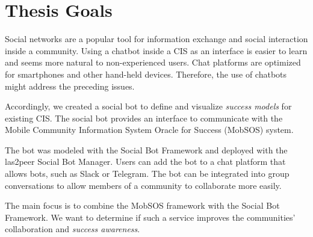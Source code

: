 \section{Thesis Goals}

Social networks are a popular tool for information exchange and social interaction inside a community.
Using a chatbot inside a CIS as an interface is easier to learn and seems more natural to non-experienced users.
Chat platforms are optimized for smartphones and other hand-held devices. Therefore, the use of chatbots might address the preceding issues.

Accordingly, we created a social bot to define and visualize \emph{success models} for existing CIS. The social bot provides an interface to communicate with the Mobile Community Information System Oracle for Success (MobSOS) system.

The bot was modeled with the Social Bot Framework and deployed with the las2peer Social Bot Manager. Users can add the bot to a chat platform that allows bots, such as Slack or Telegram.
The bot can be integrated into group conversations to allow members of a community to collaborate more easily.

The main focus is to combine the MobSOS framework with the Social Bot Framework. We want to determine if such a service improves the communities' collaboration and \emph{success awareness}.